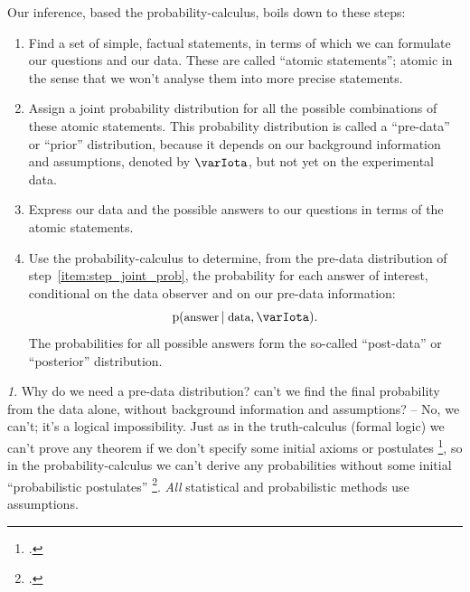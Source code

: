 \documentclass[\ifafour a4paper,12pt,\else a5paper,10pt,\fi%
onecolumn,oneside,article,%
british%
]{memoir}
\theoremstyle{remark}
\theoremstyle{innote}
\newtheorem*{innote}{}
\newcommand*{\citep}{\footcites}
\newcommand*{\pf}{\mathrm{p}}%
\renewcommand*{\|}[1][]{\nonscript\,#1\vert\nonscript\;\mathopen{}}
\newcommand*{\sect}{\S}%
\newcommand*{\yI}{\varIota}
\begin{document}
Our inference, based the probability-calculus, boils down to these steps:
\begin{enumerate}[label=\arabic*.]
\item \label{item:step_statements} Find a set of simple, factual
  statements, in terms of which we can formulate our questions and our
  data. These are called \enquote{atomic statements}; atomic in the sense
  that we won't analyse them into more precise statements.

\item \label{item:step_joint_prob} Assign a joint probability distribution
  for all the possible combinations of these atomic statements. This
  probability distribution is called a \enquote{pre-data} or
  \enquote{prior} distribution, because it depends on our background
  information and assumptions, denoted by $\yI$, but not yet on the
  experimental data.

\item \label{item:step_formulate_question_data} Express our data and the
  possible answers to our questions in terms of the atomic statements.

\item \label{item:step_calculate_probabilities} Use the
  probability-calculus to determine, from the pre-data distribution of
  step~\ref{item:step_joint_prob}, the probability for each answer of
  interest, conditional on the data observer and on our pre-data
  information:
  \begin{equation}
    \label{eq:basic_conditional_prob}
    \pf(\text{\small answer} \| \text{\small data}, \yI).
  \end{equation}
  The probabilities for all possible answers form the so-called
  \enquote{post-data} or \enquote{posterior} distribution.
\end{enumerate}

\begin{innote}
  Why do we need a pre-data distribution? can't we find the final
  probability from the data alone, without background information and
  assumptions? -- No, we can't; it's a logical impossibility. Just as in
  the truth-calculus (formal logic) we can't prove any theorem if we don't
  specify some initial axioms or postulates \citep[\sect~2.1
  p.~43]{barwiseetal1990_r2003}, so in the probability-calculus we can't
  derive any probabilities without some initial \enquote{probabilistic
    postulates} \citep{hailperin2011}[p.~182]{johnson1924}. \emph{All}
  statistical and probabilistic methods use assumptions.
\end{innote}
\end{document}
